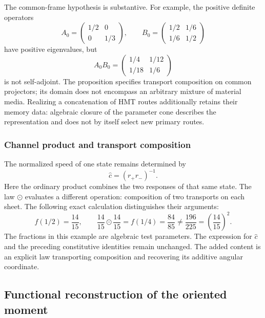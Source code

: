 The common-frame hypothesis is substantive. For example, the positive
definite operators
\[
 A_0=\begin{pmatrix}1/2&0\\0&1/3\end{pmatrix},\qquad
 B_0=\begin{pmatrix}1/2&1/6\\1/6&1/2\end{pmatrix}
\]
have positive eigenvalues, but
\[
 A_0B_0=\begin{pmatrix}1/4&1/12\\1/18&1/6\end{pmatrix}
\]
is not self-adjoint. The proposition specifies transport composition on
common projectors; its domain does not encompass an arbitrary mixture of
material media. Realizing a concatenation of HMT routes additionally
retains their memory data: algebraic closure of the parameter cone
describes the representation and does not by itself select new primary
routes.

\subsubsection{Channel product and transport composition}

The normalized speed of one state remains determined by
\[
 \widehat c=(r_+r_-)^{-1}.
\]
Here the ordinary product combines the two responses of that same state.
The law $\odot$ evaluates a different operation: composition of two
transports on each sheet. The following exact calculation distinguishes
their arguments:
\begin{equation}
 f(1/2)=\frac{14}{15},\qquad
 \frac{14}{15}\odot\frac{14}{15}=f(1/4)=\frac{84}{85}
 \ne\frac{196}{225}=\left(\frac{14}{15}\right)^2.
 \label{cr28:comp-rational-example}
\end{equation}
The fractions in this example are algebraic test parameters. The
expression for $\widehat c$ and the preceding constitutive identities
remain unchanged. The added content is an explicit law transporting
composition and recovering its additive angular coordinate.


\subsection{Functional reconstruction of the oriented moment}
\label{cr28:sec:catalan-recovery}


